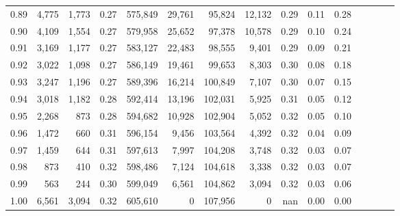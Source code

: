 \begin{tabular}{rrrcrrrrrrrrrrr}
0.89 &   4,775 &  1,773 &                                       0.27 &  575,849 &   29,761 &   95,824 &   12,132 &  0.29 &  0.11 &                         0.28 \\
0.90 &   4,109 &  1,554 &                                       0.27 &  579,958 &   25,652 &   97,378 &   10,578 &  0.29 &  0.10 &                         0.24 \\
0.91 &   3,169 &  1,177 &                                       0.27 &  583,127 &   22,483 &   98,555 &    9,401 &  0.29 &  0.09 &                         0.21 \\
0.92 &   3,022 &  1,098 &                                       0.27 &  586,149 &   19,461 &   99,653 &    8,303 &  0.30 &  0.08 &                         0.18 \\
0.93 &   3,247 &  1,196 &                                       0.27 &  589,396 &   16,214 &  100,849 &    7,107 &  0.30 &  0.07 &                         0.15 \\
0.94 &   3,018 &  1,182 &                                       0.28 &  592,414 &   13,196 &  102,031 &    5,925 &  0.31 &  0.05 &                         0.12 \\
0.95 &   2,268 &    873 &                                       0.28 &  594,682 &   10,928 &  102,904 &    5,052 &  0.32 &  0.05 &                         0.10 \\
0.96 &   1,472 &    660 &                                       0.31 &  596,154 &    9,456 &  103,564 &    4,392 &  0.32 &  0.04 &                         0.09 \\
0.97 &   1,459 &    644 &                                       0.31 &  597,613 &    7,997 &  104,208 &    3,748 &  0.32 &  0.03 &                         0.07 \\
0.98 &     873 &    410 &                                       0.32 &  598,486 &    7,124 &  104,618 &    3,338 &  0.32 &  0.03 &                         0.07 \\
0.99 &     563 &    244 &                                       0.30 &  599,049 &    6,561 &  104,862 &    3,094 &  0.32 &  0.03 &                         0.06 \\
1.00 &   6,561 &  3,094 &                                       0.32 &  605,610 &        0 &  107,956 &        0 &   nan &  0.00 &                         0.00 \\
\bottomrule
\end{tabular}
